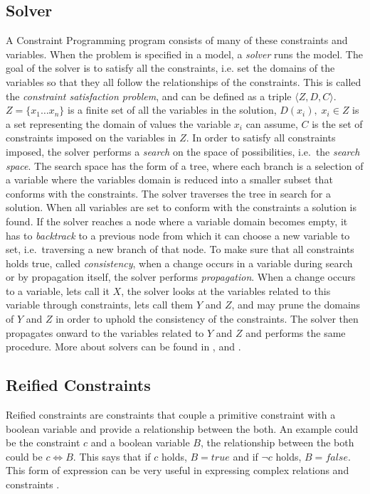 \subsection{Solver}
A Constraint Programming program consists of many of these constraints and variables. When the problem is specified in a model, a \emph{solver} runs the model. The goal of the solver is to satisfy all the constraints, i.e. set the domains of the variables so that they all follow the relationships of the constraints. This is called the \emph{constraint satisfaction problem}, and can  be defined as a triple $\langle Z,D,C \rangle$. $Z=\{x_1 \ldots x_n\}$ is a finite set of all the variables in the solution, $D(x_i), \; x_i \in Z$ is a set representing the domain of values the variable $x_i$ can assume, $C$ is the set of constraints imposed on the variables in $Z$. In order to satisfy all constraints imposed, the solver performs a \emph{search} on the space of possibilities, i.e.\ the \emph{search space}. The search space has the form of a tree, where each branch is a selection of a variable where the variables domain is reduced into a smaller subset that conforms with the constraints. The solver traverses the tree in search for a solution. When all variables are set to conform with the constraints a solution is found. If the solver reaches a node where a variable domain becomes empty, it has to \emph{backtrack} to a previous node from which it can choose a new variable to set, i.e.\ traversing a new branch of that node. To make sure that all constraints holds true, called \emph{consistency}, when a change occurs in a variable during search or by propagation itself, the solver performs \emph{propagation}. When a change occurs to a variable, lets call it $X$, the solver looks at the variables related to this variable through constraints, lets call them $Y$ and $Z$, and may prune the domains of $Y$ and $Z$ in order to uphold the consistency of the constraints. The solver then propagates onward to the variables related to $Y$ and $Z$ and performs the same procedure. More about solvers can be found in \cite{tsang_1993}, \cite{marriott_1998} and \cite{mz_manual}.

\subsection{Reified Constraints}
Reified constraints are constraints that couple a primitive constraint with a boolean variable and provide a relationship between the both. An example could be the constraint $c$ and a boolean variable $B$, the relationship between the both could be $c \Leftrightarrow B$. This says that if $c$ holds, $B = true$ and if $\neg c$ holds, $B = false$. This form of expression can be very useful in expressing complex relations and constraints \cite{marriott_1998}.

